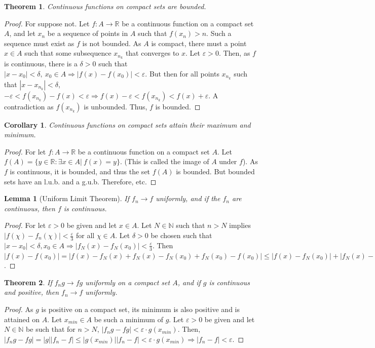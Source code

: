 \documentclass[oneside]{book}
\theoremstyle{mystyle}
\newtheorem{theorem}{Theorem}[section]
\newtheorem{lemma}{Lemma}[section]
\newtheorem{corollary}{Corollary}[section]
\begin{document}
\begin{theorem}
Continuous functions on compact sets are bounded.
\end{theorem}
\begin{proof}
For suppose not. Let $f:A\rightarrow \mathbb{R}$ be a continuous function on a compact set $A$, and let $x_n$ be a sequence of points in $A$ such that $f(x_n)>n$. Such a sequence must exist as $f$ is not bounded. As $A$ is compact, there must a point $x\in A$ such that some subsequence $x_{n_k}$ that converges to $x$. Let $\varepsilon >0$. Then, as $f$ is continuous, there is a $\delta>0$ such that $|x-x_0|<\delta,\ x_0\in A\Rightarrow |f(x)-f(x_0)|<\varepsilon$. But then for all points $x_{n_k}$ such that $|x-x_{n_k}|<\delta$, $-\varepsilon<f(x_{n_k})-f(x)<\varepsilon \Rightarrow f(x)-\varepsilon < f(x_{n_k})<f(x)+\varepsilon$. A contradiction as $f(x_{n_k})$ is unbounded. Thus, $f$ is bounded.
\end{proof}

\begin{corollary}
Continuous functions on compact sets attain their maximum and minimum.
\end{corollary}
\begin{proof}
For let $f:A\rightarrow \mathbb{R}$ be a continuous function on a compact set $A$. Let $f(A) = \{y\in \mathbb{R}:\exists x\in A|\ f(x)=y\}$. (This is called the image of $A$ under $f$). As $f$ is continuous, it is bounded, and thus the set $f(A)$ is bounded. But bounded sets have an l.u.b. and a g.u.b. Therefore, etc.
\end{proof}

\begin{lemma}[Uniform Limit Theorem]
If $f_n\rightarrow f$ uniformly, and if the $f_n$ are continuous, then $f$ is continuous.
\end{lemma}
\begin{proof}
For let $\varepsilon>0$ be given and let $x\in A$. Let $N\in \mathbb{N}$ such that $n>N$ implies $|f(\chi)-f_n(\chi)|<\frac{\varepsilon}{3}$ for all $\chi\in A$. Let $\delta>0$ be chosen such that $|x-x_0|<\delta, x_0\in A\Rightarrow |f_N(x)-f_N(x_0)|<\frac{\varepsilon}{3}$. Then  $|f(x)-f(x_0)|=|f(x)-f_N(x)+f_N(x)-f_N(x_0)+f_N(x_0)-f(x_0)|\leq |f(x)-f_N(x_0)|+|f_N(x)-f_N(x_0)|+|f(x_0)-f_N(x_0)|<\varepsilon$.
\end{proof}

\begin{theorem}
If $f_ng\rightarrow fg$ uniformly on a compact set $A$, and if $g$ is continuous and positive, then $f_n\rightarrow f$ uniformly.
\end{theorem}
\begin{proof}
As $g$ is positive on a compact set, its minimum is also positive and is attained on $A$. Let $x_{min}\in A$ be such a minimum of $g$. Let $\varepsilon>0$ be given and let $N\in \mathbb{N}$ be such that for $n>N$, $|f_ng-fg|<\varepsilon\cdot g(x_{min})$. Then, $|f_ng-fg|=|g||f_n-f|\leq |g(x_{min})||f_n-f|<\varepsilon \cdot g(x_{min})\Rightarrow |f_n-f|<\varepsilon$.
\end{proof}
\end{document}
